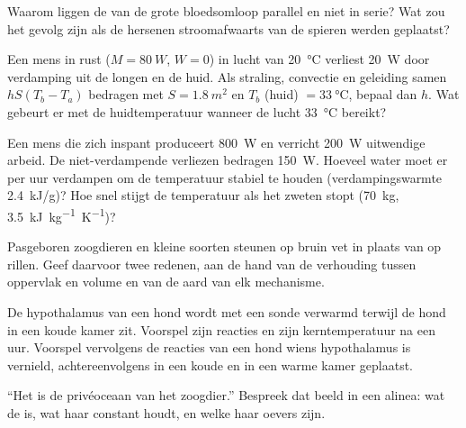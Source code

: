 \begin{exercise}[$\star\star$]\label{exo:b1:mammal-organization:7}
Waarom liggen de  van de grote bloedsomloop parallel en niet in serie?
Wat zou het gevolg zijn als de hersenen stroomafwaarts van de spieren werden
geplaatst?
\end{exercise}

\begin{exercise}[$\star\star$]\label{exo:b1:mammal-organization:8}
Een mens in rust ($M = \qty{80}{W}$, $W = 0$) in lucht van
\qty{20}{\celsius} verliest \qty{20}{W} door verdamping uit de longen en de
huid. Als straling, convectie en geleiding samen $hS(T_b - T_a)$ bedragen met
$S = \qty{1.8}{m^2}$ en $T_b$ (huid) $=
\qty{33}{\celsius}$, bepaal dan $h$. Wat gebeurt er met de huidtemperatuur
wanneer de lucht \qty{33}{\celsius} bereikt?
\end{exercise}

\begin{exercise}[$\star\star$]\label{exo:b1:mammal-organization:9}
Een mens die zich inspant produceert \qty{800}{W} en verricht \qty{200}{W}
uitwendige arbeid. De niet-verdampende verliezen bedragen \qty{150}{W}. Hoeveel
water moet er per uur verdampen om de temperatuur stabiel te houden
(verdampingswarmte \qty{2.4}{kJ/g})? Hoe snel stijgt de temperatuur als het
zweten stopt (\qty{70}{kg}, \qty{3.5}{kJ.kg^{-1}.K^{-1}})?
\end{exercise}

\begin{exercise}[$\star\star\star$]\label{exo:b1:mammal-organization:10}
Pasgeboren zoogdieren en kleine soorten steunen op bruin vet in plaats van op
rillen. Geef daarvoor twee redenen, aan de hand van de verhouding tussen
oppervlak en volume en van de aard van elk mechanisme.
\end{exercise}

\begin{exercise}[$\star\star\star$]\label{exo:b1:mammal-organization:11}
De hypothalamus van een hond wordt met een sonde verwarmd terwijl de hond in
een koude kamer zit. Voorspel zijn reacties en zijn kerntemperatuur na een uur.
Voorspel vervolgens de reacties van een hond wiens hypothalamus is vernield,
achtereenvolgens in een koude en in een warme kamer geplaatst.
\end{exercise}

\begin{exercise}[$\star\star\star$]\label{exo:b1:mammal-organization:12}
``Het  is de privéoceaan van het zoogdier.'' Bespreek dat beeld in
een alinea: wat de  is, wat haar constant houdt, en
welke  haar oevers zijn.
\end{exercise}

